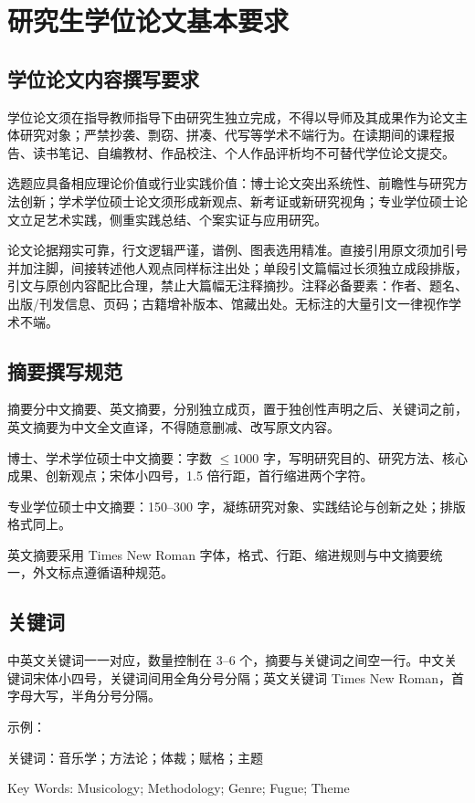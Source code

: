 
\chapter{研究生学位论文基本要求}

\section{学位论文内容撰写要求}

学位论文须在指导教师指导下由研究生独立完成，不得以导师及其成果作为论文主体研究对象；严禁抄袭、剽窃、拼凑、代写等学术不端行为。在读期间的课程报告、读书笔记、自编教材、作品校注、个人作品评析均不可替代学位论文提交。

选题应具备相应理论价值或行业实践价值：博士论文突出系统性、前瞻性与研究方法创新；学术学位硕士论文须形成新观点、新考证或新研究视角；专业学位硕士论文立足艺术实践，侧重实践总结、个案实证与应用研究。

论文论据翔实可靠，行文逻辑严谨，谱例、图表选用精准。直接引用原文须加引号并加注脚，间接转述他人观点同样标注出处；单段引文篇幅过长须独立成段排版，引文与原创内容配比合理，禁止大篇幅无注释摘抄。注释必备要素：作者、题名、出版/刊发信息、页码；古籍增补版本、馆藏出处。无标注的大量引文一律视作学术不端。

\section{摘要撰写规范}

摘要分中文摘要、英文摘要，分别独立成页，置于独创性声明之后、关键词之前，英文摘要为中文全文直译，不得随意删减、改写原文内容。

博士、学术学位硕士中文摘要：字数 $\leq 1000$ 字，写明研究目的、研究方法、核心成果、创新观点；宋体小四号，1.5 倍行距，首行缩进两个字符。

专业学位硕士中文摘要：150--300 字，凝练研究对象、实践结论与创新之处；排版格式同上。

英文摘要采用 Times New Roman 字体，格式、行距、缩进规则与中文摘要统一，外文标点遵循语种规范。

\section{关键词}

中英文关键词一一对应，数量控制在 3--6 个，摘要与关键词之间空一行。中文关键词宋体小四号，关键词间用全角分号分隔；英文关键词 Times New Roman，首字母大写，半角分号分隔。

示例：

关键词：音乐学；方法论；体裁；赋格；主题

Key Words: Musicology; Methodology; Genre; Fugue; Theme